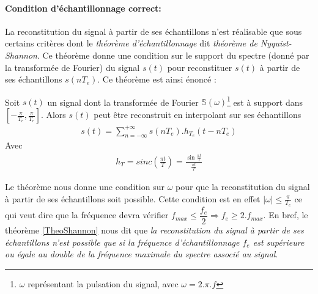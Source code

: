 \paragraph{Condition d'échantillonnage correct:}
La reconstitution du signal à partir de ses échantillons n'est réalisable que sous certains critères dont le \emph{théorème d'échantillonnage} dit \emph{théorème de Nyquist-Shannon}. Ce théorème donne une condition sur le support du spectre (donné par la transformée de Fourier) du signal $ s(t) $ pour reconstituer $ s(t) $ à partir de ses échantillons $ s(nT_{e}) $. Ce théorème est ainsi énoncé \cite{beal2012theorie}:
\begin{theorem}\label{TheoShannon}
Soit $ s(t) $ un signal dont la transformée de Fourier $ \mathbb{S}(\omega) $\footnote{$ \omega $ représentant la pulsation du signal, avec $ \omega=2.\pi.f $} est à support dans $ [-\frac{\pi}{T_{e}},\frac{\pi}{T_{e}}] $. Alors $ s(t) $ peut être reconstruit en interpolant sur ses échantillons
\begin{eqnarray}
s(t) = \sum_{n=-\infty}^{+\infty}s(nT_{e}).h_{T_{e}}(t-nT_{e})
\end{eqnarray}
Avec
\begin{eqnarray}
h_{T} = sinc(\frac{{\pi}t}{T}) = \frac{\sin\frac{\pi t}{T}}{\frac{\pi t}{T}}
\end{eqnarray}
\end{theorem}
Le théorème nous donne une condition sur  $ \omega $ pour que la reconstitution du signal à partir de ses échantillons soit possible. Cette condition est en effet $ | \omega | \leq \frac{\pi}{T_{e}} $ ce qui veut dire que la fréquence devra vérifier $ f_{max} \leq \dfrac{f_{e}}{2} \Rightarrow f_{e} \geq 2.f_{max} $. En bref, le théorème \ref{TheoShannon} nous dit que \emph{la reconstitution du signal à partir de ses échantillons n'est possible que si la fréquence d'échantillonnage $ f_{e} $ est supérieure ou égale au double de la fréquence maximale du spectre associé au signal}.
